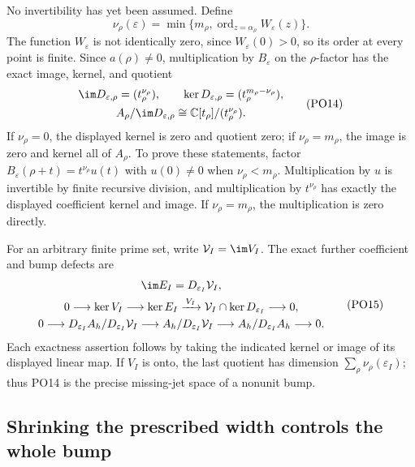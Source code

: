 \documentclass[11pt,a4paper]{article}
\theoremstyle{definition}\newtheorem{definition}[theorem]{Definition}
\newcommand{\C}{\mathbb C}\newcommand{\R}{\mathbb R}
\begin{document}
No invertibility has yet been assumed. Define
\[
 \nu_\rho(\varepsilon)=
    \min\{m_\rho,\operatorname{ord}_{z=\alpha_\rho}W_\varepsilon(z)\}.
 \tag{PO13}\label{PO:po:vanishing}
\]
The function \(W_\varepsilon\) is not identically zero, since
\(W_\varepsilon(0)>0\), so its order at every point is finite.
Since \(a(\rho)\ne0\), multiplication by \(B_\varepsilon\) on the
\(\rho\)-factor has the exact image, kernel, and quotient
\[
 \begin{gathered}
 \im D_{\varepsilon,\rho}=(t_\rho^{\nu_\rho}),\qquad
 \ker D_{\varepsilon,\rho}=(t_\rho^{m_\rho-\nu_\rho}),\\
 A_\rho/\im D_{\varepsilon,\rho}\cong\C[t_\rho]/(t_\rho^{\nu_\rho}).
 \end{gathered}
 \tag{PO14}\label{PO:po:nonunit}
\]
If \(\nu_\rho=0\), the displayed kernel is zero and quotient
zero; if \(\nu_\rho=m_\rho\), the image is zero and kernel all
of \(A_\rho\). To prove these statements, factor
\(B_\varepsilon(\rho+t)=t^{\nu_\rho}u(t)\) with \(u(0)\ne0\)
when \(\nu_\rho<m_\rho\). Multiplication by \(u\) is invertible
by finite recursive division, and multiplication by \(t^{\nu_\rho}\)
has exactly the displayed coefficient kernel and image.
If \(\nu_\rho=m_\rho\), the multiplication is zero directly.

For an arbitrary finite prime set, write \(\mathcal V_I=\im V_I\).
The exact further coefficient and bump defects are
\[
 \begin{gathered}
 \im E_I=D_{\varepsilon_I}\mathcal V_I,\\
 0\longrightarrow\ker V_I\longrightarrow\ker E_I
     \xrightarrow{\,V_I\,}\mathcal V_I\cap\ker D_{\varepsilon_I}
       \longrightarrow0,\\
 0\longrightarrow D_{\varepsilon_I}A_h/D_{\varepsilon_I}\mathcal V_I
   \longrightarrow A_h/D_{\varepsilon_I}\mathcal V_I
   \longrightarrow A_h/D_{\varepsilon_I}A_h\longrightarrow0 .
 \end{gathered}
 \tag{PO15}\label{PO:po:defects}
\]
Each exactness assertion follows by taking the indicated kernel
or image of its displayed linear map. If \(V_I\) is onto,
the last quotient has dimension \(\sum_\rho\nu_\rho(\varepsilon_I)\);
thus PO14 is the precise missing-jet space of a nonunit bump.

\subsection{Shrinking the prescribed width controls the whole bump}
\end{document}

